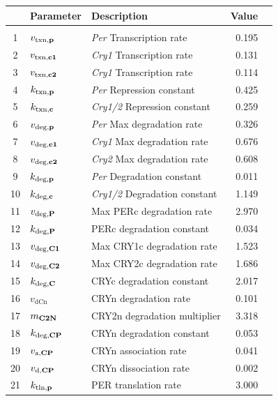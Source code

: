 \clearpage
\begin{table}
    \centering
\begin{tabular}{cllrr} \hline
    & Parameter                 & Description                       & Value \\ \hline\\
    1  & $v_{\text{txn,{\bf p}}}$  & {\it Per} Transcription rate      & 0.195        \\
    2  & $v_{\text{txn,{\bf c1}}}$ & {\it Cry1} Transcription rate     & 0.131        \\
    3  & $v_{\text{txn,{\bf c2}}}$ & {\it Cry1} Transcription rate     & 0.114        \\
    4  & $k_{\text{txn,{\bf p}}}$  & {\it Per} Repression constant     & 0.425        \\
    5  & $k_{\text{txn,{\bf c}}}$  & {\it Cry1/2} Repression constant  & 0.259        \\
    6  & $v_{\text{deg,{\bf p}}}$  & {\it Per} Max degradation rate    & 0.326        \\
    7  & $v_{\text{deg,{\bf c1}}}$ & {\it Cry1} Max degradation rate   & 0.676        \\
    8  & $v_{\text{deg,{\bf c2}}}$ & {\it Cry2} Max degradation rate   & 0.608        \\
    9  & $k_{\text{deg,{\bf p}}}$  & {\it Per} Degradation constant    & 0.011        \\
    10 & $k_{\text{deg,{\bf c}}}$  & {\it Cry1/2} Degradation constant & 1.149        \\
    11 & $v_{\text{deg,{\bf P}}}$  & Max PERc degradation rate         & 2.970        \\
    12 & $k_{\text{deg,{\bf P}}}$  & PERc degradation constant         & 0.034        \\
    13 & $v_{\text{deg,{\bf C1}}}$ & Max CRY1c degradation rate        & 1.523        \\
    14 & $v_{\text{deg,{\bf C2}}}$ & Max CRY2c degradation rate        & 1.686        \\
    15 & $k_{\text{deg,{\bf C}}}$  & CRYc degradation constant         & 2.017        \\
    16 & $v_{\text{dCn}}$ & CRYn degradation rate             & 0.101        \\
    17 & $m_{\text{\bf C2N}}$      & CRY2n degradation multiplier      & 3.318        \\
    18 & $k_{\text{deg,{\bf CP}}}$ & CRYn degradation constant         & 0.053        \\
    19 & $v_{\text{a,{\bf CP}}}$   & CRYn association rate             & 0.041        \\
    20 & $v_{\text{d,{\bf CP}}}$   & CRYn dissociation rate            & 0.002        \\
    21 & $k_{\text{tln,{\bf p}}}$  & PER translation rate              & 3.000        \\ \hline
    \hline
  \end{tabular}
\end{table}


